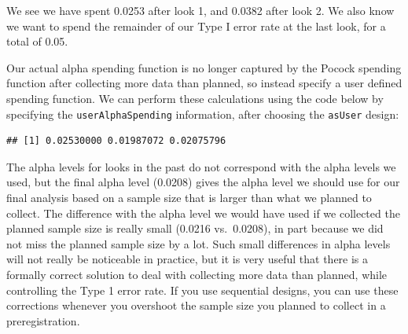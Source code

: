 \documentclass[
  oneside]{book}
\newenvironment{Shaded}{\begin{snugshade}}{\end{snugshade}}
\newcommand{\AttributeTok}[1]{\textcolor[rgb]{0.77,0.63,0.00}{#1}}
\newcommand{\DecValTok}[1]{\textcolor[rgb]{0.00,0.00,0.81}{#1}}
\newcommand{\FloatTok}[1]{\textcolor[rgb]{0.00,0.00,0.81}{#1}}
\newcommand{\FunctionTok}[1]{\textcolor[rgb]{0.00,0.00,0.00}{#1}}
\newcommand{\NormalTok}[1]{#1}
\newcommand{\OtherTok}[1]{\textcolor[rgb]{0.56,0.35,0.01}{#1}}
\newcommand{\SpecialCharTok}[1]{\textcolor[rgb]{0.00,0.00,0.00}{#1}}
\newcommand{\StringTok}[1]{\textcolor[rgb]{0.31,0.60,0.02}{#1}}
\begin{document}
We see we have spent 0.0253 after look 1, and 0.0382 after look 2. We also know we want to spend the remainder of our Type I error rate at the last look, for a total of 0.05.

Our actual alpha spending function is no longer captured by the Pocock spending function after collecting more data than planned, so instead specify a user defined spending function. We can perform these calculations using the code below by specifying the \texttt{userAlphaSpending} information, after choosing the \texttt{asUser} design:

\begin{Shaded}
\end{Shaded}

\begin{verbatim}
## [1] 0.02530000 0.01987072 0.02075796
\end{verbatim}

The alpha levels for looks in the past do not correspond with the alpha levels we used, but the final alpha level (0.0208) gives the alpha level we should use for our final analysis based on a sample size that is larger than what we planned to collect. The difference with the alpha level we would have used if we collected the planned sample size is really small (0.0216 vs.~0.0208), in part because we did not miss the planned sample size by a lot. Such small differences in alpha levels will not really be noticeable in practice, but it is very useful that there is a formally correct solution to deal with collecting more data than planned, while controlling the Type 1 error rate. If you use sequential designs, you can use these corrections whenever you overshoot the sample size you planned to collect in a preregistration.
\end{document}
